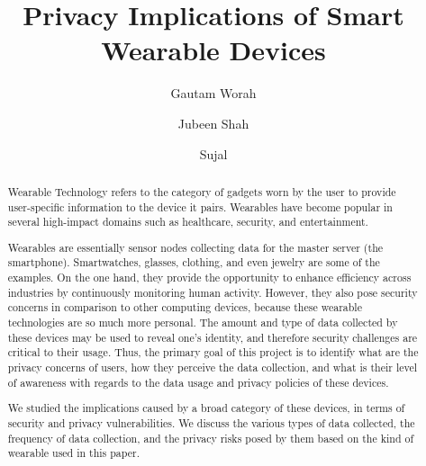 \documentclass[sigconf]{acmart}
\begin{document}
\title{Privacy Implications of Smart Wearable Devices}

\author{Gautam Worah}

\author{Jubeen Shah}


\author{Sujal}





\begin{abstract} \label{abstract}
 Wearable Technology refers to the category of gadgets worn by the user to provide user-specific information to the device it pairs. Wearables have become popular in several high-impact domains such as healthcare, security, and entertainment. 

Wearables are essentially sensor nodes collecting data for the master server (the smartphone). Smartwatches, glasses, clothing, and even jewelry are some of the examples. On the one hand, they provide the opportunity to enhance efficiency across industries by continuously monitoring human activity. However, they also pose security concerns in comparison to other computing devices, because these wearable technologies are so much more personal. The amount and type of data collected by these devices may be used to reveal one’s identity, and therefore security challenges are critical to their usage. Thus, the primary goal of this project is to identify what are the privacy concerns of users, how they perceive the data collection, and what is their level of awareness with regards to the data usage and privacy policies of these devices. 

We studied the implications caused by a broad category of these devices, in terms of security and privacy vulnerabilities. We discuss the various types of data collected, the frequency of data collection, and the privacy risks posed by them based on the kind of wearable used in this paper.
\end{abstract}
\end{document}
